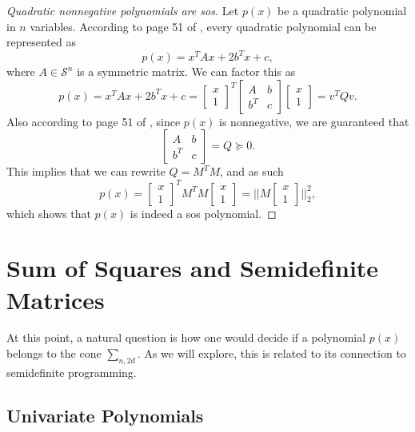 	\begin{proof} [Quadratic nonnegative polynomials are sos]
		Let $p(x)$ be a quadratic polynomial in $n$ variables. According to page 51 of \cite{BlekhermanGrigoriy;ParriloPabloA.;Thomas2013}, every quadratic polynomial can be represented as 
		$$
		p(x) = x^T A x + 2b^T x + c, 
		$$
		where $A \in \mathcal{S}^n$ is a symmetric matrix. We can factor this as
		$$
		p(x) = x^T A x + 2b^T x + c = \begin{bmatrix}
		x \\ 1
		\end{bmatrix}^T \begin{bmatrix} A & b \\ b^T & c \end{bmatrix} \begin{bmatrix}
		x \\ 1
		\end{bmatrix} = v^T Q v.
		$$
		Also according to page 51 of \cite{BlekhermanGrigoriy;ParriloPabloA.;Thomas2013}, since $p(x)$ is nonnegative, we are guaranteed that 
		$$
		\begin{bmatrix} A & b \\ b^T & c \end{bmatrix} = Q \succeq 0.
		$$
		This implies that we can rewrite $Q = M^TM$, and as such 
		$$
		p(x) = \begin{bmatrix}
		x \\ 1
		\end{bmatrix}^T M^T M \begin{bmatrix}
		x \\ 1
		\end{bmatrix}
		=
		||M \begin{bmatrix}
		x \\ 1
		\end{bmatrix}||_2^2,
		$$
		which shows that $p(x)$ is indeed a sos polynomial.
	\end{proof}
	
	\section{Sum of Squares and Semidefinite Matrices}
	
	At this point, a natural question is how one would decide if a polynomial $p(x)$ belongs to the cone $\sum_{n, 2d}$. As we will explore, this is related to its connection to semidefinite programming. 
	
	\subsection{Univariate Polynomials}
	
